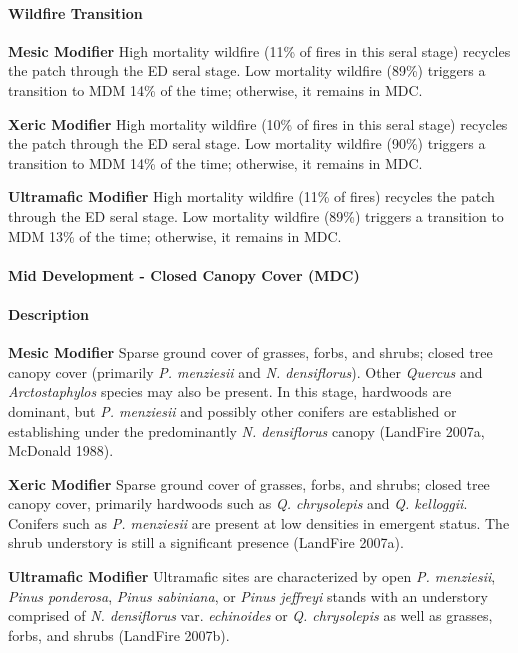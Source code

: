\paragraph{Wildfire Transition}
\begin{adjustwidth}{2cm}{}
\textbf{Mesic Modifier } High mortality wildfire (11\% of fires in this seral stage) recycles the patch through the ED seral stage. Low mortality wildfire (89\%) triggers a transition to MDM 14\% of the time; otherwise, it remains in MDC.

\medskip
\noindent \textbf{Xeric Modifier} High mortality wildfire (10\% of fires in this seral stage) recycles the patch through the ED seral stage. Low mortality wildfire (90\%) triggers a transition to MDM 14\% of the time; otherwise, it remains in MDC.

\medskip
\noindent \textbf{Ultramafic Modifier} High mortality wildfire (11\% of fires) recycles the patch through the ED seral stage. Low mortality wildfire (89\%) triggers a transition to MDM 13\% of the time; otherwise, it remains in MDC.

\end{adjustwidth}
\noindent\hrulefill

\paragraph{Mid Development - Closed Canopy Cover (MDC)}

\paragraph{Description}
\begin{adjustwidth}{2cm}{}
\textbf{Mesic Modifier } Sparse ground cover of grasses, forbs, and shrubs; closed tree canopy cover (primarily \emph{P. menziesii} and \emph{N. densiflorus}). Other \emph{Quercus} and \emph{Arctostaphylos} species may also be present. In this stage, hardwoods are dominant, but \emph{P. menziesii} and possibly other conifers are established or establishing under the predominantly \emph{N. densiflorus} canopy (LandFire 2007a, McDonald 1988). 

\medskip
\noindent \textbf{Xeric Modifier} Sparse ground cover of grasses, forbs, and shrubs; closed tree canopy cover, primarily hardwoods such as \emph{Q. chrysolepis} and \emph{Q. kelloggii}. Conifers such as \emph{P. menziesii} are present at low densities in emergent status. The shrub understory is still a significant presence (LandFire 2007a). 

\medskip
\noindent \textbf{Ultramafic Modifier} Ultramafic sites are characterized by open \emph{P. menziesii}, \emph{Pinus ponderosa}, \emph{Pinus sabiniana}, or \emph{Pinus jeffreyi} stands with an understory comprised of \emph{N. densiflorus} var. \emph{echinoides} or \emph{Q. chrysolepis} as well as grasses, forbs, and shrubs (LandFire 2007b).

\end{adjustwidth}
